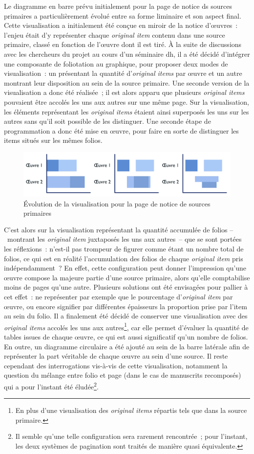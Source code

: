 \documentclass[a4paper,12pt,twoside]{book}
\newcommand{\eng}{\emph}
\newcommand{\oi}{\eng{original item}\xspace}
\newcommand{\ois}{\eng{original items}\xspace}
\newcommand{\dhu}{\gls{dh}\xspace}
\begin{document}
Le diagramme en barre prévu initialement pour la page de notice ds sources primaires a particulièrement évolué entre sa forme liminaire et son aspect final. Cette visualisation a initialement été conçue en miroir de la notice d'œuvres~: l'enjeu était d'y représenter chaque \oi contenu dans une source primaire, classé en fonction de l'œuvre dont il est tiré. À la suite de discussions avec les chercheurs du projet au cours d'un séminaire \dhu, il a été décidé d'intégrer une composante de foliotation au graphique, pour proposer deux modes de visualisation~: un présentant la quantité d'\ois par œuvre et un autre montrant leur disposition au sein de la source primaire. Une seconde version de la visualisation a donc été réalisée~; il est alors apparu que plusieurs \ois pouvaient être accolés les uns aux autres sur une même page. Sur la visualisation, les éléments représentant les \ois étaient ainsi superposés les uns sur les autres sans qu'il soit possible de les distinguer. Une seconde étape de programmation a donc été mise en œuvre, pour faire en sorte de distinguer les items situés sur les mêmes folios.

\begin{figure}[h!]
	\centering
	\includegraphics[width=15cm]{Images/Evolution-visualisation.png}
	\caption{Évolution de la visualisation pour la page de notice de sources primaires}
\end{figure}

C'est alors sur la visualisation représentant la quantité accumulée de folios –~montrant les \oi juxtaposés les uns aux autres~– que se sont portées les réflexions~: n'est-il pas trompeur de figurer comme étant un nombre total de folios, ce qui est en réalité l'accumulation des folios de chaque \oi pris indépendamment~? En effet, cette configuration peut donner l'impression qu'une œuvre compose la majeure partie d'une source primaire, alors qu'elle comptabilise moins de pages qu'une autre. Plusieurs solutions ont été envisagées pour pallier à cet effet~: ne représenter par exemple que le pourcentage d'\oi par œuvre, ou encore signifier par différentes épaisseurs la proportion prise par l'item au sein du folio. Il a finalement été décidé de conserver une visualisation avec des \ois accolés les uns aux autres\footnote{En plus d'une visualisation des \ois répartis tels que dans la source primaire.}, car elle permet d'évaluer la quantité de tables issues de chaque œuvre, ce qui est aussi significatif qu'un nombre de folios. En outre, un diagramme circulaire a été ajouté au sein de la barre latérale afin de représenter la part véritable de chaque œuvre au sein d'une source. Il reste cependant des interrogations vis-à-vis de cette visualisation, notamment la question du mélange entre folio et page (dans le cas de manuscrits recomposés) qui a pour l'instant été éludée\footnote{Il semble qu'une telle configuration sera rarement rencontrée~; pour l'instant, les deux systèmes de pagination sont traités de manière quasi équivalente.}.
\end{document}
